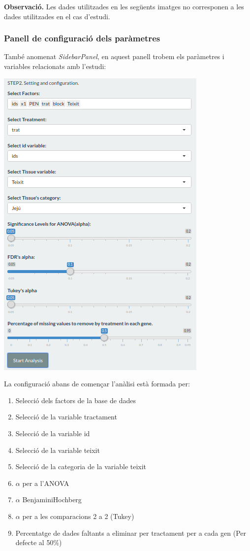 \documentclass[english]{article}
\begin{document}
\textbf{Observació.} Les dades utilitzades en les següents imatges no corresponen a les dades utilitzades en el cas d'estudi.
\subsubsection{Panell de configuració dels paràmetres}
També anomenat \textit{SidebarPanel}, en aquest panell trobem els paràmetres i variables relacionats amb l'estudi:
\begin{center}
\includegraphics[scale=0.4]{app2.png}
\end{center}
La configuració abans de comen\c{c}ar l'anàlisi està formada per:
\begin{enumerate}
\item Selecció dels factors de la base de dades
\item Selecció de la variable tractament
\item Selecció de la variable id
\item Selecció de la variable teixit
\item Selecció de la categoria de la variable teixit
\item $\alpha$ per a l'ANOVA
\item $\alpha$ BenjaminiHochberg
\item $\alpha$ per a les comparacions 2 a 2 (Tukey)
\item Percentatge de dades faltants a eliminar per tractament per a cada gen (Per defecte al 50$\%$)
\end{enumerate}
\newpage
\end{document}
